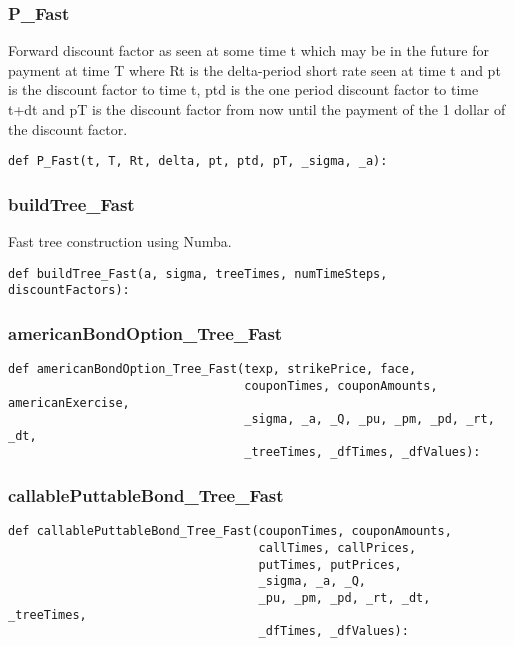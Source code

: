 \documentclass[twoside,11pt]{book}
\begin{document}
\subsubsection*{{\bf P\_Fast}}
Forward discount factor as seen at some time t which may be in the future for payment at time T where Rt is the delta-period short rate seen at time t and pt is the discount factor to time t, ptd is the one period discount factor to time t+dt and pT is the discount factor from now until the payment of the 1 dollar of the discount factor.  

\begin{lstlisting}
def P_Fast(t, T, Rt, delta, pt, ptd, pT, _sigma, _a):
\end{lstlisting}

\subsubsection*{{\bf buildTree\_Fast}}
Fast tree construction using Numba.  

\begin{lstlisting}
def buildTree_Fast(a, sigma, treeTimes, numTimeSteps, discountFactors):
\end{lstlisting}

\subsubsection*{{\bf americanBondOption\_Tree\_Fast}}


\begin{lstlisting}
def americanBondOption_Tree_Fast(texp, strikePrice, face,
                                 couponTimes, couponAmounts, americanExercise,
                                 _sigma, _a, _Q, _pu, _pm, _pd, _rt, _dt,
                                 _treeTimes, _dfTimes, _dfValues):
\end{lstlisting}

\subsubsection*{{\bf callablePuttableBond\_Tree\_Fast}}


\begin{lstlisting}
def callablePuttableBond_Tree_Fast(couponTimes, couponAmounts,
                                   callTimes, callPrices,
                                   putTimes, putPrices,
                                   _sigma, _a, _Q,
                                   _pu, _pm, _pd, _rt, _dt, _treeTimes,
                                   _dfTimes, _dfValues):
\end{lstlisting}
\end{document}
